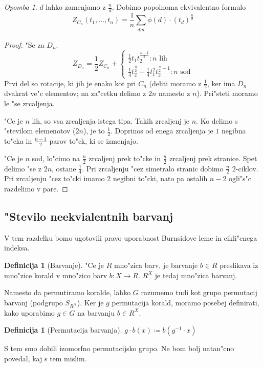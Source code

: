 \documentclass[a4paper,12pt]{article}
\theoremstyle{definition}
\newtheorem{defn}[counter]{Definicija}
\theoremstyle{remark}
\newtheorem*{rem}{Opomba}
\begin{document}
\begin{rem}
	$d$ lahko zamenjamo z $\frac{n}{d}$. Dobimo popolnoma ekvivalentno formulo
	\[Z_{C_n}(t_1, \ldots, t_n) = \frac{1}{n}\sum_{d|n}\phi(d) \cdot (t_d)^\frac{n}{d}\]
\end{rem}
\begin{proof}"Se za $D_n$.
	\[
	Z_{D_n} = \frac{1}{2}Z_{C_n} +
	\begin{cases}
		\frac{1}{2} t_1 t_2^{\frac{n-1}{2}}: n \text{ lih}
		\\
		\frac{1}{4} t_2^{\frac{n}{2}} + \frac{1}{4} t_1^2 t_2^{\frac{n}{2}-1}: n \text{ sod}
	\end{cases}
	\]
	Prvi del so rotacije, ki jih je enako kot pri $C_n$ (deliti moramo z $\frac{1}{2}$, ker ima $D_n$ dvakrat ve"c elementov; na za"cetku delimo z $2n$ namesto z $n$). Pri"steti moramo le "se zrcaljenja. 
	
	"Ce je $n$ lih, so vsa zrcaljenja istega tipa. Takih zrcaljenj je $n$. Ko delimo s "stevilom elemenotov ($2n$), je to $\frac{1}{2}$. Doprinos od enega zrcaljenja je $1$ negibna to"cka in $\frac{n-1}{2}$ parov to"ck, ki se izmenjajo.
	
	"Ce je $n$ sod, lo"cimo na $\frac{n}{2}$ zrcaljenj prek to"cke in $\frac{n}{2}$ zrcaljenj prek stranice. Spet delimo "se z $2n$, ostane $\frac{1}{4}$. Pri zrcaljenju "cez simetralo stranic dobimo $\frac{n}{2}$ $2$-ciklov. Pri zrcaljenju "cez to"cki imamo $2$ negibni to"cki, nato pa ostalih $n-2$ ogli"s"c razdelimo v pare.
\end{proof}


\subsection{"Stevilo neekvialentnih barvanj}
V tem razdelku bomo ugotovili pravo uporabnost Burnsidove leme in cikli"cnega indeksa.
\begin{defn}[Barvanje]
	"Ce je $R$ mno"zica barv, je barvanje $b \in R$ preslikava iz mno"zice korald v mno"zico barv
	$b : X \to R$.
	$R^X$ je tedaj mno"zica barvanj.
\end{defn}

Namesto da permutiramo koralde, lahko $G$ razumemo tudi kot grupo permutacij barvanj (podgrupo $S_{R^X}$). Ker je $g$ permutacija korald, moramo posebej definirati, kako uporabimo $g \in G$ na barvanju $b \in R^X$.
\begin{defn}[Permutacija barvanja]
	$g \cdot b(x) \coloneqq b (g^{-1} \cdot x)$
\end{defn}
S tem smo dobili izomorfno permutacijsko grupo. Ne bom bolj natan"cno povedal, kaj s tem mislim.
\end{document}

